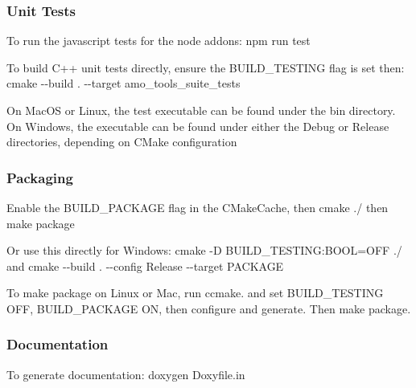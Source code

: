 \subsubsection*{Unit Tests}


\begin{DoxyItemize}
\item To run the javascript tests for the node addons\+: {\ttfamily npm run test}
\item To build C++ unit tests directly, ensure the {\ttfamily B\+U\+I\+L\+D\+\_\+\+T\+E\+S\+T\+I\+NG} flag is set then\+: {\ttfamily cmake -\/-\/build . -\/-\/target amo\+\_\+tools\+\_\+suite\+\_\+tests}
\item On Mac\+OS or Linux, the test executable can be found under the {\ttfamily bin} directory. On Windows, the executable can be found under either the {\ttfamily Debug} or {\ttfamily Release} directories, depending on C\+Make configuration
\end{DoxyItemize}

\subsubsection*{Packaging}


\begin{DoxyItemize}
\item Enable the {\ttfamily B\+U\+I\+L\+D\+\_\+\+P\+A\+C\+K\+A\+GE} flag in the C\+Make\+Cache, then {\ttfamily cmake ./} then {\ttfamily make package}
\item Or use this directly for Windows\+: {\ttfamily cmake -\/D B\+U\+I\+L\+D\+\_\+\+T\+E\+S\+T\+I\+NG\+:B\+O\+OL=O\+FF ./} and {\ttfamily cmake -\/-\/build . -\/-\/config Release -\/-\/target P\+A\+C\+K\+A\+GE}
\item To make package on Linux or Mac, run {\ttfamily ccmake.} and set B\+U\+I\+L\+D\+\_\+\+T\+E\+S\+T\+I\+NG O\+FF, B\+U\+I\+L\+D\+\_\+\+P\+A\+C\+K\+A\+GE ON, then configure and generate. Then {\ttfamily make package}.
\end{DoxyItemize}

\subsubsection*{Documentation}


\begin{DoxyItemize}
\item To generate documentation\+: {\ttfamily doxygen Doxyfile.\+in} 
\end{DoxyItemize}